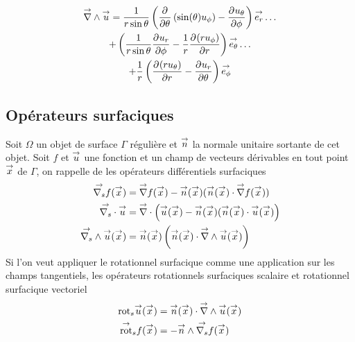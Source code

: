     \begin{multline}
        \vrot \vu = \frac{1}{r\sin\theta}\left(\ddr{\theta}{}\left(\sin(\theta)u_\phi\right) - \ddr{\phi}{u_\theta}\right)\vect{e_r}\dots
        \\
        + \left(\frac{1}{r\sin\theta}\ddr{\phi}{u_r} - \frac{1}{r}\ddr{r}{(ru_\phi)} \right)\vect{e_\theta} \dots
        \\
        + \frac{1}{r}\left(\ddr{r}{(ru_\theta)}-\ddr{\theta}{u_r}\right)\vect{e_\phi}
    \end{multline}

\subsection{Opérateurs surfaciques}

    Soit \(\Omega\) un objet de surface \(\Gamma\) régulière et \(\vn\) la normale unitaire sortante de cet objet.
    Soit \(f\) et \(\vu\) une fonction et un champ de vecteurs dérivables en tout point \(\vx\) de \(\Gamma\), on rappelle de \cite{nedelec_acoustic_2001} les opérateurs différentiels surfaciques
    \begin{align}
        \vgrads{f}(\vx) &= \vgrad{f}(\vx) - \vn(\vx) (\vn(\vx) \cdot \vgrad{f}(\vx))
        \\
        \vdivs{\vu} &= \vdiv\left(\vu(\vx) - \vn(\vx) (\vn(\vx) \cdot \vu(\vx)\right)
        \\
        \vrots{\vu}(\vx) &= \vn(\vx)\left(\vn(\vx) \cdot \vrot{\vu}(\vx)\right)
    \end{align}
    Si l'on veut appliquer le rotationnel surfacique comme une application sur les champs tangentiels, les opérateurs rotationnels surfaciques scalaire et rotationnel surfacique vectoriel
    \begin{align}
        \trots{\vu}(\vx) &= \vn(\vx) \cdot \vrot{\vu}(\vx)
        \\
        \tvrots{f}(\vx) &= - \vn \pvect \vgrads f(\vx)
    \end{align}